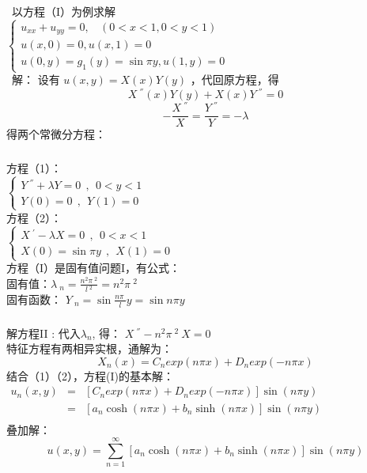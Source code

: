 \begin{frame}
	\frametitle{}
	 以方程（I）为例求解\\
	$\displaystyle \begin{cases}
		u_{xx} +u_{yy} =0 ,~~~~ (0<x<1, 0<y<1)\\
		u(x,0)= 0,  u(x,1)= 0 \\
		u(0,y)= g_1 (y) =\sin \pi y,  u(1,y)= 0
	\end{cases}$ \\
	\alert{ 解：}	设有 	$ u(x,y)=X(x) Y(y)$ ，代回原方程，得
	\begin{equation*}
		X~^{''}(x)Y(y) +X(x)Y~^{''}=0
	\end{equation*}
	\begin{equation*}
		-\frac{X~^{''}}{X}=\frac{Y~^{''} }{Y} =-\lambda 
	\end{equation*}	
	得两个常微分方程：
\end{frame}	

\begin{frame}
	\frametitle{}	
	方程（1）：\\
	$\displaystyle  \begin{cases}
		Y~^{''} +\lambda Y=0  ~~,~~ 0<y<1\\
		Y(0)=0 ~~,~~Y(1)=0 
	\end{cases}$ \\	
	方程（2）：\\
	$\displaystyle  \begin{cases}
		X~^{'} -\lambda X=0  ~~,~~ 0<x<1 \\
		X(0)=\sin \pi y~~,~~X(1)=0 
	\end{cases}$ \\	
	方程（I）是固有值问题I，有公式：\\
	固有值：$\displaystyle  \lambda~_n=\frac{n^2\pi~^2}{l~^2} =n^2\pi~^2$ \\ 
	固有函数： $\displaystyle  Y~_n= \sin \frac{n\pi~}{l} y = \sin n \pi y $ \\	
\end{frame}	

\begin{frame}
	\frametitle{}	
	解方程II : 
	代入$\lambda_n$, 得：
	$\displaystyle  X~^{''} - n^2\pi~^2~X=0 $ \\
	特征方程有两相异实根，通解为： \\ 
	\begin{equation*}
		X_n(x)=C_n exp(n\pi x )+ D_n exp(-n\pi x )
	\end{equation*}	
	结合（1）（2），方程(I)的基本解：\\ 
	$\displaystyle \begin{array}{llll}
		u_n(x,y) &=& [C_n exp(n\pi x )+ D_n exp(-n\pi x )] \sin (n \pi y)  \\ 
		&=& [a_n \cosh (n\pi x )+ b_n \sinh(n\pi x ) ]\sin (n \pi y)  \\ 
	\end{array}$ \\
	叠加解：
	\begin{equation*}
		u(x, y)   = \sum\limits_{n=1}^{\infty }  [a_n \cosh (n\pi x )+ b_n \sinh (n\pi x ) ] \sin (n \pi y)  
	\end{equation*}	
\end{frame}	

